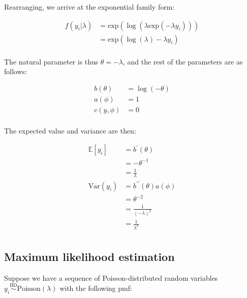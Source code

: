 \documentclass{report}
\begin{document}
Rearranging, we arrive at the exponential family form:

\begin{equation}\label{eq:ex-glm-exponential-dist-exp-form}
    \begin{aligned}
        f(y_i|\lambda)
          &= \text{exp}(\log(\lambda\text{exp}(-\lambda y_i))) \\
          &= \text{exp}(\log(\lambda) - \lambda y_i) \\
    \end{aligned}
\end{equation}

The natural parameter is thus $\theta = -\lambda$, and the rest of the parameters are as follows:

\begin{equation}\label{eq:ex-glm-exponential-dist-params}
    \begin{aligned}
        b(\theta) &= \log(-\theta) \\
        a(\phi) &= 1 \\
        c(y, \phi) &= 0 \\
    \end{aligned}
\end{equation}

The expected value and variance are then:

\begin{equation}\label{eq:ex-glm-exponential-dist-mean-var}
    \begin{aligned}
        \mathbb{E}[y_i]
          &= b^\prime(\theta) \\
          &= -\theta^{-1} \\
          &= \frac{1}{\lambda} \\
        \text{Var}(y_i)
          &= b^{\prime\prime}(\theta)a(\phi) \\
          &= \theta^{-2} \\
          &= \frac{1}{(-\lambda)^2} \\
          &= \frac{1}{\lambda^2} \\
    \end{aligned}
\end{equation}

\subsection{Maximum likelihood estimation}

Suppose we have a sequence of Poisson-distributed random variables $y_i \overset{\text{IID}}{\sim} \text{Poisson}(\lambda)$ with the following \gls{pmf}:
\end{document}
